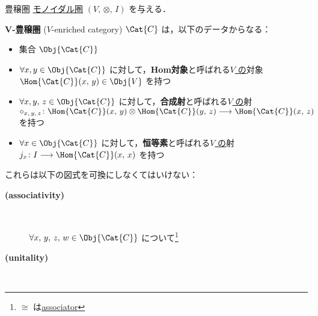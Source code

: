 \documentclass[TQFT_main]{subfiles}
\begin{document}
\begin{mydef}[label=def:enriched,breakable]{豊穣圏}
    \hyperref[def:monoidal-category]{モノイダル圏} $(V,\, \otimes,\, I)$ を与える．

    $\bm{V}$\textbf{-豊穣圏} ($V$-enriched category) $\Cat{C}$ は，以下のデータからなる：
    \begin{itemize}
        \item 集合 $\Obj{\Cat{C}}$
        \item $\forall x, y \in \Obj{\Cat{C}}$ に対して，\textbf{Hom対象}と呼ばれる\underline{$V$ の}対象 $\Hom{\Cat{C}}(x,\, y) \in \Obj{V}$ を持つ
        \item $\forall x, y,\, z \in \Obj{\Cat{C}}$ に対して，\textbf{合成射}と呼ばれる\underline{$V$ の}射 $\circ_{x,\, y,\, z} \colon \Hom{\Cat{C}}(x,\, y) \otimes \Hom{\Cat{C}}(y,\, z) \lto \Hom{\Cat{C}} (x,\, z)$ を持つ
        \item $\forall x \in \Obj{\Cat{C}}$ に対して，\textbf{恒等素}と呼ばれる\underline{$V$ の}射 $j_x \colon I \lto \Hom{\Cat{C}} (x,\, x)$ を持つ
    \end{itemize}
    これらは以下の図式を可換にしなくてはいけない：
    \begin{description}
        \item[\textbf{(associativity)}]　
        
        $\forall x,\, y,\, z,\, w \in \Obj{\Cat{C}}$ について\footnote{$\cong$ は\hyperref[def:monoidal-category]{associator}}
        \begin{center}
        \end{center}
        
        \item[\textbf{(unitality)}]　
        

\end{description}
\end{mydef}
\end{document}

